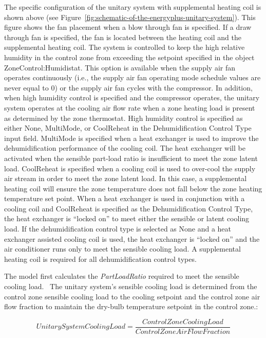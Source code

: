 The specific configuration of the unitary system with supplemental heating coil is shown above (see Figure~\ref{fig:schematic-of-the-energyplus-unitary-system}). This figure shows the fan placement when a blow through fan is specified. If a draw through fan is specified, the fan is located between the heating coil and the supplemental heating coil. The system is controlled to keep the high relative humidity in the control zone from exceeding the setpoint specified in the object ZoneControl:Humidistat. This option is available when the supply air fan operates continuously (i.e., the supply air fan operating mode schedule values are never equal to 0) or the supply air fan cycles with the compressor. In addition, when high humidity control is specified and the compressor operates, the unitary system operates at the cooling air flow rate when a zone heating load is present as determined by the zone thermostat. High humidity control is specified as either None, MultiMode, or CoolReheat in the Dehumidification Control Type input field. MultiMode is specified when a heat exchanger is used to improve the dehumidification performance of the cooling coil. The heat exchanger will be activated when the sensible part-load ratio is insufficient to meet the zone latent load. CoolReheat is specified when a cooling coil is used to over-cool the supply air stream in order to meet the zone latent load. In this case, a supplemental heating coil will ensure the zone temperature does not fall below the zone heating temperature set point. When a heat exchanger is used in conjunction with a cooling coil and CoolReheat is specified as the Dehumidification Control Type, the heat exchanger is ``locked on'' to meet either the sensible or latent cooling load. If the dehumidification control type is selected as None and a heat exchanger assisted cooling coil is used, the heat exchanger is ``locked on'' and the air conditioner runs only to meet the sensible cooling load. A supplemental heating coil is required for all dehumidification control types.

The model first calculates the \emph{PartLoadRatio} required to meet the sensible cooling load.~ The unitary system's sensible cooling load is determined from the control zone sensible cooling load to the cooling setpoint and the control zone air flow fraction to maintain the dry-bulb temperature setpoint in the control zone.:

\begin{equation}
UnitarySystemCoolingLoad = \frac{{ControlZoneCoolingLoad}}{{ControlZoneAirFlowFraction}}
\end{equation}

